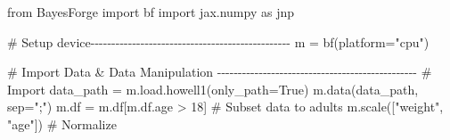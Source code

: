 \documentclass[
  letterpaper,
  DIV=11,
  numbers=noendperiod]{scrartcl}
\newenvironment{Shaded}{\begin{snugshade}}{\end{snugshade}}
\newcommand{\CommentTok}[1]{\textcolor[rgb]{0.37,0.37,0.37}{#1}}
\newcommand{\DecValTok}[1]{\textcolor[rgb]{0.68,0.00,0.00}{#1}}
\newcommand{\ImportTok}[1]{\textcolor[rgb]{0.00,0.46,0.62}{#1}}
\newcommand{\NormalTok}[1]{\textcolor[rgb]{0.00,0.23,0.31}{#1}}
\newcommand{\OperatorTok}[1]{\textcolor[rgb]{0.37,0.37,0.37}{#1}}
\newcommand{\StringTok}[1]{\textcolor[rgb]{0.13,0.47,0.30}{#1}}
\newcommand{\VariableTok}[1]{\textcolor[rgb]{0.07,0.07,0.07}{#1}}
\begin{document}
\begin{Shaded}
\begin{Highlighting}[]
\ImportTok{from}\NormalTok{ BayesForge }\ImportTok{import}\NormalTok{ bf}
\ImportTok{import}\NormalTok{ jax.numpy }\ImportTok{as}\NormalTok{ jnp}

\CommentTok{\# Setup device{-}{-}{-}{-}{-}{-}{-}{-}{-}{-}{-}{-}{-}{-}{-}{-}{-}{-}{-}{-}{-}{-}{-}{-}{-}{-}{-}{-}{-}{-}{-}{-}{-}{-}{-}{-}{-}{-}{-}{-}{-}{-}{-}{-}{-}{-}{-}{-}}
\NormalTok{m }\OperatorTok{=}\NormalTok{ bf(platform}\OperatorTok{=}\StringTok{"cpu"}\NormalTok{)}

\CommentTok{\# Import Data \& Data Manipulation {-}{-}{-}{-}{-}{-}{-}{-}{-}{-}{-}{-}{-}{-}{-}{-}{-}{-}{-}{-}{-}{-}{-}{-}{-}{-}{-}{-}{-}{-}{-}{-}{-}{-}{-}{-}{-}{-}{-}{-}{-}{-}{-}{-}{-}{-}{-}{-}}
\CommentTok{\# Import}
\NormalTok{data\_path }\OperatorTok{=}\NormalTok{ m.load.howell1(only\_path}\OperatorTok{=}\VariableTok{True}\NormalTok{)}
\NormalTok{m.data(data\_path, sep}\OperatorTok{=}\StringTok{";"}\NormalTok{)}
\NormalTok{m.df }\OperatorTok{=}\NormalTok{ m.df[m.df.age }\OperatorTok{\textgreater{}} \DecValTok{18}\NormalTok{]  }\CommentTok{\# Subset data to adults}
\NormalTok{m.scale([}\StringTok{"weight"}\NormalTok{, }\StringTok{"age"}\NormalTok{])  }\CommentTok{\# Normalize}


\end{Highlighting}
\end{Shaded}
\end{document}
